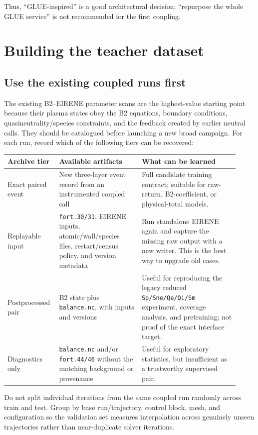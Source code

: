 \documentclass[11pt]{article}
\begin{document}
Thus, ``GLUE-inspired'' is a good architectural decision; ``repurpose the whole GLUE service'' is not recommended for the first coupling.

\section{Building the teacher dataset}

\subsection{Use the existing coupled runs first}

The existing B2--EIRENE parameter scans are the highest-value starting point because their plasma states obey the B2 equations, boundary conditions, quasineutrality/species constraints, and the feedback created by earlier neutral calls. They should be catalogued before launching a new broad campaign. For each run, record which of the following tiers can be recovered:

\begin{longtable}{@{}p{0.18\linewidth}p{0.34\linewidth}p{0.40\linewidth}@{}}
\toprule
Archive tier & Available artifacts & What can be learned \\
\midrule
\endhead
Exact paired event & New three-layer event record from an instrumented coupled call & Full candidate training contract; suitable for raw-return, B2-coefficient, or physical-total models. \\
Replayable input & \texttt{fort.30/31}, EIRENE inputs, atomic/wall/species files, restart/census policy, and version metadata & Run standalone EIRENE again and capture the missing raw output with a new writer. This is the best way to upgrade old cases. \\
Postprocessed pair & B2 state plus \texttt{balance.nc}, with inputs and versions & Useful for reproducing the legacy reduced \texttt{Sp/Sne/Qe/Qi/Sm} experiment, coverage analysis, and pretraining; not proof of the exact interface target. \\
Diagnostics only & \texttt{balance.nc} and/or \texttt{fort.44/46} without the matching background or provenance & Useful for exploratory statistics, but insufficient as a trustworthy supervised pair. \\
\bottomrule
\end{longtable}

Do not split individual iterations from the same coupled run randomly across train and test. Group by base run/trajectory, control block, mesh, and configuration so the validation set measures interpolation across genuinely unseen trajectories rather than near-duplicate solver iterations.
\end{document}
